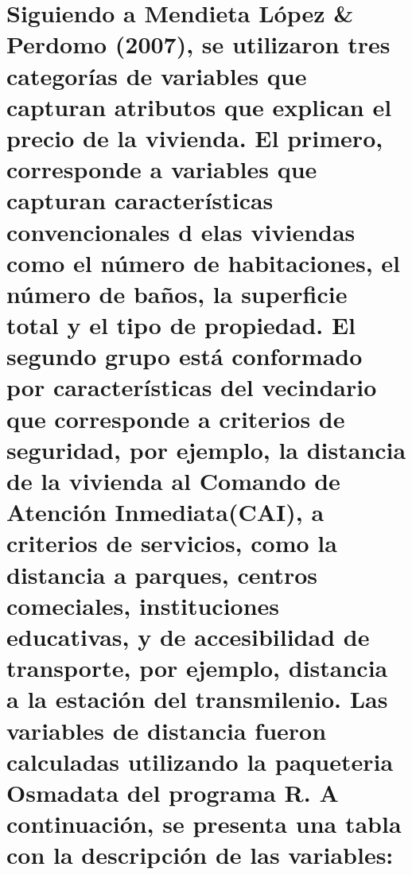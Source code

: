\documentclass[
  11pt,
  letterpaper,
]{article}
\begin{document}
\hypertarget{siguiendo-a-mendieta-se-utilizaron-tres-categoruxedas-de-variables-que-capturan-atributos-que-explican-el-precio-de-la-vivienda.-el-primero-corresponde-a-variables-que-capturan-caracteruxedsticas-convencionales-d-elas-viviendas-como-el-nuxfamero-de-habitaciones-el-nuxfamero-de-bauxf1os-la-superficie-total-y-el-tipo-de-propiedad.-el-segundo-grupo-estuxe1-conformado-por-caracteruxedsticas-del-vecindario-que-corresponde-a-criterios-de-seguridad-por-ejemplo-la-distancia-de-la-vivienda-al-comando-de-atenciuxf3n-inmediatacai-a-criterios-de-servicios-como-la-distancia-a-parques-centros-comeciales-instituciones-educativas-y-de-accesibilidad-de-transporte-por-ejemplo-distancia-a-la-estaciuxf3n-del-transmilenio.-las-variables-de-distancia-fueron-calculadas-utilizando-la-paqueteria-osmadata-del-programa-r.-a-continuaciuxf3n-se-presenta-una-tabla-con-la-descripciuxf3n-de-las-variables}{%
\section{Siguiendo a Mendieta López \& Perdomo (2007), se utilizaron tres categorías de variables que capturan atributos que explican el precio de la vivienda. El primero, corresponde a variables que capturan características convencionales d elas viviendas como el número de habitaciones, el número de baños, la superficie total y el tipo de propiedad. El segundo grupo está conformado por características del vecindario que corresponde a criterios de seguridad, por ejemplo, la distancia de la vivienda al Comando de Atención Inmediata(CAI), a criterios de servicios, como la distancia a parques, centros comeciales, instituciones educativas, y de accesibilidad de transporte, por ejemplo, distancia a la estación del transmilenio. Las variables de distancia fueron calculadas utilizando la paqueteria Osmadata del programa R. A continuación, se presenta una tabla con la descripción de las variables:}\label{siguiendo-a-mendieta-se-utilizaron-tres-categoruxedas-de-variables-que-capturan-atributos-que-explican-el-precio-de-la-vivienda.-el-primero-corresponde-a-variables-que-capturan-caracteruxedsticas-convencionales-d-elas-viviendas-como-el-nuxfamero-de-habitaciones-el-nuxfamero-de-bauxf1os-la-superficie-total-y-el-tipo-de-propiedad.-el-segundo-grupo-estuxe1-conformado-por-caracteruxedsticas-del-vecindario-que-corresponde-a-criterios-de-seguridad-por-ejemplo-la-distancia-de-la-vivienda-al-comando-de-atenciuxf3n-inmediatacai-a-criterios-de-servicios-como-la-distancia-a-parques-centros-comeciales-instituciones-educativas-y-de-accesibilidad-de-transporte-por-ejemplo-distancia-a-la-estaciuxf3n-del-transmilenio.-las-variables-de-distancia-fueron-calculadas-utilizando-la-paqueteria-osmadata-del-programa-r.-a-continuaciuxf3n-se-presenta-una-tabla-con-la-descripciuxf3n-de-las-variables}}
\end{document}

